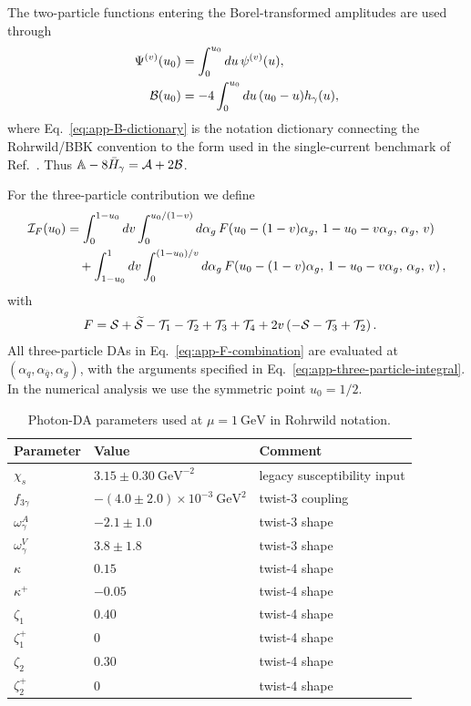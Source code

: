 \documentclass[aps,prd,preprint,nofootinbib,superscriptaddress]{revtex4-2}
\newcommand{\GeV}{\mathrm{GeV}}
\begin{document}
The two-particle functions entering the Borel-transformed amplitudes are used
through
\begin{align}
  \Psi^{(v)}(u_0)
  &=
  \int_0^{u_0}du\,\psi^{(v)}(u),
  \label{eq:app-Psiv-int}\\
  {\cal B}(u_0)
  &=
  -4\int_0^{u_0}du\,(u_0-u)h_\gamma(u),
  \label{eq:app-B-dictionary}
\end{align}
where Eq.~\eqref{eq:app-B-dictionary} is the notation dictionary connecting
the Rohrwild/BBK convention to the form used in the single-current benchmark
of Ref.~\cite{Colangelo:2005hv}.  Thus
$\mathbb A-8\bar H_\gamma={\cal A}+2{\cal B}$.

For the three-particle contribution we define
\begin{align}
  {\cal I}_{F}(u_0)
  &=
  \int_0^{1-u_0}dv
  \int_0^{u_0/(1-v)}d\alpha_g\,
  F\!\left(
  u_0-(1-v)\alpha_g,\,
  1-u_0-v\alpha_g,\,
  \alpha_g,\,
  v
  \right)
  \notag\\
  &\quad
  +\int_{1-u_0}^{1}dv
  \int_0^{(1-u_0)/v}d\alpha_g\,
  F\!\left(
  u_0-(1-v)\alpha_g,\,
  1-u_0-v\alpha_g,\,
  \alpha_g,\,
  v
  \right),
  \label{eq:app-three-particle-integral}
\end{align}
with
\begin{align}
  F
  &=
  {\cal S}
  +\widetilde{\cal S}
  -{\cal T}_1
  -{\cal T}_2
  +{\cal T}_3
  +{\cal T}_4
  +2v\left(-{\cal S}-{\cal T}_3+{\cal T}_2\right).
  \label{eq:app-F-combination}
\end{align}
All three-particle DAs in Eq.~\eqref{eq:app-F-combination} are evaluated at
\((\alpha_q,\alpha_{\bar q},\alpha_g)\), with the arguments specified in
Eq.~\eqref{eq:app-three-particle-integral}.  In the numerical analysis we use
the symmetric point \(u_0=1/2\).

\begin{table}[t]
\caption{Photon-DA parameters used at $\mu=1~\GeV$ in Rohrwild notation.}
\label{tab:app-photon-params}
\begin{ruledtabular}
\begin{tabular}{lll}
Parameter & Value & Comment\\
\hline
$\chi_s$ & $3.15\pm0.30~\GeV^{-2}$ & legacy susceptibility input\\
$f_{3\gamma}$ & $-(4.0\pm2.0)\times10^{-3}~\GeV^2$ & twist-3 coupling\\
$\omega_\gamma^A$ & $-2.1\pm1.0$ & twist-3 shape\\
$\omega_\gamma^V$ & $3.8\pm1.8$ & twist-3 shape\\
$\kappa$ & $0.15$ & twist-4 shape\\
$\kappa^+$ & $-0.05$ & twist-4 shape\\
$\zeta_1$ & $0.40$ & twist-4 shape\\
$\zeta_1^+$ & $0$ & twist-4 shape\\
$\zeta_2$ & $0.30$ & twist-4 shape\\
$\zeta_2^+$ & $0$ & twist-4 shape\\
\end{tabular}
\end{ruledtabular}
\end{table}
\end{document}
